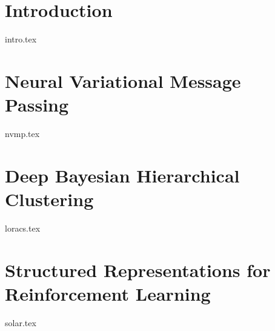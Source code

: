 \chapter{Introduction}
\label{chap:bsrl-intro}
{intro.tex}

\chapter{Neural Variational Message Passing}
\label{chap:nvmp}
{nvmp.tex}

\chapter{Deep Bayesian Hierarchical Clustering}
\label{chap:loracs}
{loracs.tex}

\chapter{Structured Representations for Reinforcement Learning}
\label{chap:solar}
{solar.tex}
